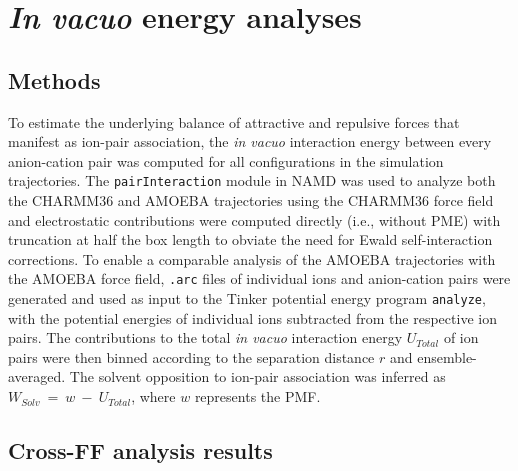 \documentclass[journal=jacsat,articletitle=true,manuscript=suppinfo,layout=onecolumn]{achemso}
\begin{document}
    \section{\emph{In vacuo} energy analyses}
    
    \subsection{Methods}
    To estimate the underlying balance of attractive and repulsive forces that manifest as ion-pair association, the \emph{in vacuo} interaction energy between every anion-cation pair was computed for all configurations in the simulation trajectories. The \texttt{pairInteraction} module in NAMD was used to analyze both the CHARMM36 and AMOEBA trajectories using the CHARMM36 force field and electrostatic contributions were computed directly (i.e., without PME) with truncation at half the box length to obviate the need for Ewald self-interaction corrections. To enable a comparable analysis of the AMOEBA trajectories with the AMOEBA force field, \texttt{.arc} files of individual ions and anion-cation pairs were generated and used as input to the Tinker potential energy program \texttt{analyze}, with the potential energies of individual ions subtracted from the respective ion pairs. The contributions to the total \emph{in vacuo} interaction energy $U_{Total}$ of ion pairs were then binned according to the separation distance $r$ and ensemble-averaged. The solvent opposition to ion-pair association was inferred as $W_{Solv}~=~w~-~U_{Total}$, where $w$ represents the PMF.



    \subsection{Cross-FF analysis results}
    
\end{document}
